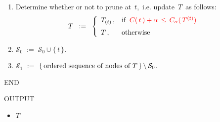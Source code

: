 \begin{center}
\begin{tcolorbox}[width=0.90\linewidth,colback=white,colframe=gray]
\begin{center}
\begin{minipage}{0.85\linewidth}
\begin{enumerate}
\item
	Determine whether or not to prune at \,$t$,\, i.e. update \,$T$\, as follows:
	\begin{equation*}
	T \;\; := \;\;
	\left\{\begin{array}{ll}
		T_{(t)}\,, & \textnormal{if}\;\; {\color{red}C(\,t\,) + \alpha \,\leq\, C_{\alpha}(\,T^{(t)})}
		\\
		T\,, & \overset{{\color{white}1}}{\textnormal{otherwise}}
		\end{array}\right.
	\end{equation*}
\item
	$\mathcal{S}_{0} \; := \; \mathcal{S}_{0} \cup \{\,t\,\}$.
\item
	$\mathcal{S}_{1}$
	\;$:=$\;
		$\left\{\,\textnormal{ordered sequence of nodes of $T$}\,\right\} \backslash \, \mathcal{S}_{0}$.
\end{enumerate}
END
\end{minipage}
\end{center}
\vskip 0.3cm
OUTPUT
\begin{itemize}
\item
	$T$
\end{itemize}
\vskip 0.1cm
\end{tcolorbox}
\end{center}

